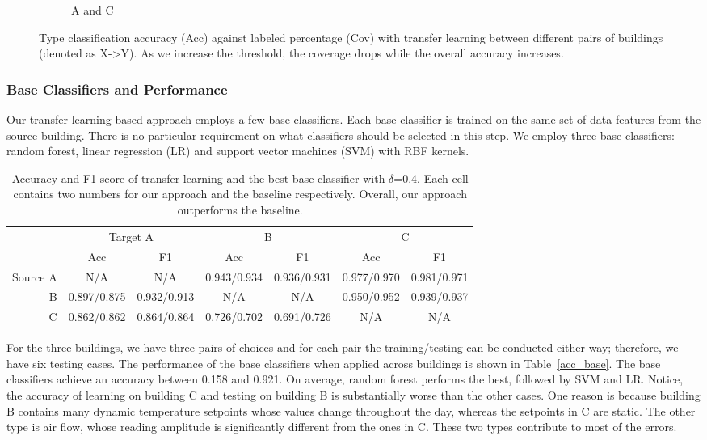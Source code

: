 \begin{figure}[ht!]
\begin{subfigure}{0.32\textwidth}
                \caption{A and C}
  \end{subfigure}
\caption{Type classification accuracy (Acc) against labeled percentage (Cov) with transfer learning between different pairs of buildings (denoted as X->Y). As we increase the threshold, the coverage drops while the overall accuracy increases. }
\label{fig:tl_acc}
\end{figure}

\subsubsection{Base Classifiers and Performance}
\label{sec:baseline}
Our transfer learning based approach employs a few base classifiers. Each base classifier is trained on the same set of data features from the source building. There is no particular requirement on 
what classifiers should be selected in this step.  
We employ three base classifiers: random forest, linear regression (LR) and support vector machines (SVM) with RBF kernels.


\begin{table}[]
\centering
\begin{tabular}{r|c|c|c|c|c|c}
\hline
\multirow{2}{*}{} & \multicolumn{2}{c|}{Target A} & \multicolumn{2}{c|}{B} & \multicolumn{2}{c}{C} \\ \cline{2-7} 
                  & Acc        & F1        & Acc        & F1        & Acc        & F1        \\ \hline\hline
Source A                 & N/A      & N/A     & 0.943/0.934      & 0.936/0.931     & 0.977/0.970      & 0.981/0.971     \\ \hline
B                 & 0.897/0.875     & 0.932/0.913     & N/A      & N/A     & 0.950/0.952      & 0.939/0.937     \\ \hline
C                 & 0.862/0.862     & 0.864/0.864     & 0.726/0.702      & 0.691/0.726     & N/A     & N/A     \\ \hline
\end{tabular}
\caption{Accuracy and F1 score of transfer learning and the best base classifier with $\delta$=0.4. Each cell contains two numbers for our approach and the baseline respectively. Overall, our approach outperforms the baseline.}
\label{table:f1}
\end{table}

For the three buildings, we have three pairs of choices and for each pair the training/testing can be conducted either way; therefore, we have six testing cases.
The performance of the base classifiers when applied across buildings is shown in Table~\ref{acc_base}.  The base classifiers achieve an accuracy between 0.158 and 0.921.
On average, random forest performs the best, followed by SVM and LR. 
Notice, the accuracy of learning on building C and testing on building B is substantially worse than the other cases. 
One reason is because building B contains many dynamic temperature setpoints whose values change throughout the day, whereas the setpoints in C are static. 
The other type is air flow, whose reading amplitude is significantly different from the ones in C. These two types contribute to most of the errors. %


